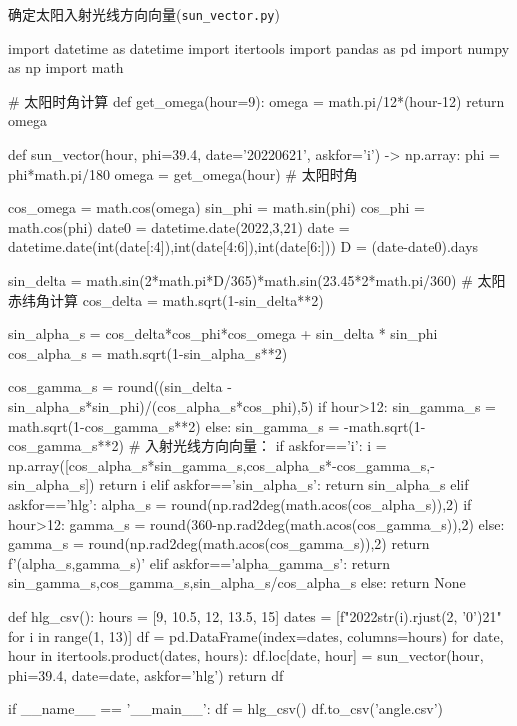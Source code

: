 \documentclass{article}
\numberwithin{equation}{subsection}
\begin{document}
确定太阳入射光线方向向量(\verb|sun_vector.py|)
\begin{python}
import datetime as datetime
import itertools
import pandas as pd
import numpy as np
import math


# 太阳时角计算
def get_omega(hour=9):
    omega = math.pi/12*(hour-12)
    return omega


def sun_vector(hour, phi=39.4, date='20220621', askfor='i') -> np.array:
    phi = phi*math.pi/180
    omega = get_omega(hour)     # 太阳时角

    cos_omega = math.cos(omega)
    sin_phi = math.sin(phi)
    cos_phi = math.cos(phi)
    date0 = datetime.date(2022,3,21)
    date = datetime.date(int(date[:4]),int(date[4:6]),int(date[6:]))
    D = (date-date0).days

    sin_delta = math.sin(2*math.pi*D/365)*math.sin(23.45*2*math.pi/360)  # 太阳赤纬角计算
    cos_delta = math.sqrt(1-sin_delta**2)

    sin_alpha_s = cos_delta*cos_phi*cos_omega + sin_delta * sin_phi
    cos_alpha_s = math.sqrt(1-sin_alpha_s**2)

    cos_gamma_s = round((sin_delta - sin_alpha_s*sin_phi)/(cos_alpha_s*cos_phi),5)
    if hour>12:
        sin_gamma_s = math.sqrt(1-cos_gamma_s**2)
    else:
        sin_gamma_s = -math.sqrt(1-cos_gamma_s**2)
    # 入射光线方向向量：
    if askfor=='i':
        i = np.array([cos_alpha_s*sin_gamma_s,cos_alpha_s*-cos_gamma_s,-sin_alpha_s])
        return i
    elif askfor=='sin_alpha_s':
        return sin_alpha_s
    elif askfor=='hlg':
        alpha_s = round(np.rad2deg(math.acos(cos_alpha_s)),2)
        if hour>12:
            gamma_s = round(360-np.rad2deg(math.acos(cos_gamma_s)),2)
        else:
            gamma_s = round(np.rad2deg(math.acos(cos_gamma_s)),2)
        return f'({alpha_s},{gamma_s})'
    elif askfor=='alpha_gamma_s':
        return sin_gamma_s,cos_gamma_s,sin_alpha_s/cos_alpha_s
    else:
        return None


def hlg_csv():
    hours = [9, 10.5, 12, 13.5, 15]
    dates = [f"2022{str(i).rjust(2, '0')}21" for i in range(1, 13)]
    df = pd.DataFrame(index=dates, columns=hours)
    for date, hour in itertools.product(dates, hours):
        df.loc[date, hour] = sun_vector(hour, phi=39.4, date=date, askfor='hlg')
    return df


if __name__ == '__main__':
    df = hlg_csv()
    df.to_csv('angle.csv')
\end{python}
\end{document}
